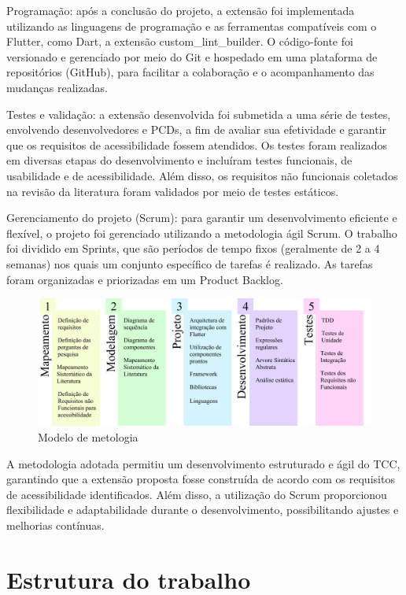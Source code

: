 Programação: após a conclusão do projeto, a extensão foi implementada utilizando as linguagens de programação e as ferramentas compatíveis com o Flutter, como Dart, a extensão custom\_lint\_builder. O código-fonte foi versionado e gerenciado por meio do Git e hospedado em uma plataforma de repositórios (GitHub), para facilitar a colaboração e o acompanhamento das mudanças realizadas.

Testes e validação: a extensão desenvolvida foi submetida a uma série de testes, envolvendo desenvolvedores e PCDs, a fim de avaliar sua efetividade e garantir que os requisitos de acessibilidade fossem atendidos. Os testes foram realizados em diversas etapas do desenvolvimento e incluíram testes funcionais, de usabilidade e de acessibilidade. Além disso, os requisitos não funcionais coletados na revisão da literatura foram validados por meio de testes estáticos.

Gerenciamento do projeto (Scrum): para garantir um desenvolvimento eficiente e flexível, o projeto foi gerenciado utilizando a metodologia ágil Scrum. O trabalho foi dividido em Sprints, que são períodos de tempo fixos (geralmente de 2 a 4 semanas) nos quais um conjunto específico de tarefas é realizado. As tarefas foram organizadas e priorizadas em um Product Backlog.

\begin{figure}[!h]
	\centering
	\label{fig:metodologia}
	\caption{Modelo de metologia}
	\includegraphics[scale=1]{Assets/Modelo de metodologia.png}
\end{figure}

A metodologia adotada permitiu um desenvolvimento estruturado e ágil do TCC, garantindo que a extensão proposta fosse construída de acordo com os requisitos de acessibilidade identificados. Além disso, a utilização do Scrum proporcionou flexibilidade e adaptabilidade durante o desenvolvimento, possibilitando ajustes e melhorias contínuas.

\section{Estrutura do trabalho}

